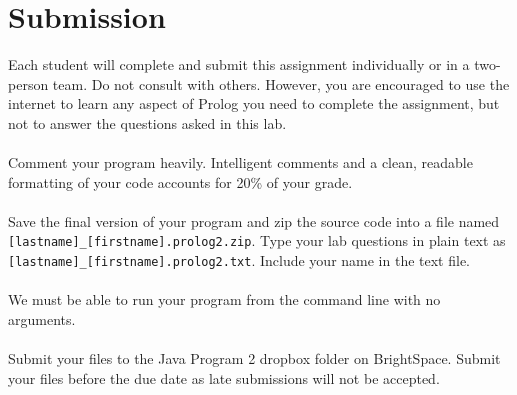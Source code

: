 \documentclass{article}
\begin{document}
\section*{Submission}
Each student will complete and submit this assignment individually or in a two-person team. Do not consult with others. However, you are encouraged to use the internet to learn any aspect of Prolog you need to complete the assignment, but not to answer the questions asked in this lab.
\\\\
Comment your program heavily. Intelligent comments and a clean, readable formatting of your code accounts for 20\% of your grade.
\\\\
Save the final version of your program and zip the source code into a file named \verb|[lastname]_[firstname].prolog2.zip|. Type your lab questions in plain text as \verb|[lastname]_[firstname].prolog2.txt|. Include your name in the text file.
\\\\
We must be able to run your program from the command line with no arguments.
\\\\
Submit your files to the Java Program 2 dropbox folder on BrightSpace. Submit your files before the due date as late submissions will not be accepted.
\end{document}
